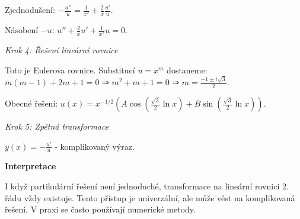 \begin{example}
Zjednodušení: $-\frac{u''}{u} = \frac{1}{x^2} + \frac{2}{x}\frac{u'}{u}$.

Násobení $-u$: $u'' + \frac{2}{x}u' + \frac{1}{x^2}u = 0$.

\noindent\textit{Krok 4: Řešení lineární rovnice}

Toto je Eulerova rovnice. Substitucí $u = x^m$ dostaneme:
$m(m-1) + 2m + 1 = 0$ ⇒ $m^2 + m + 1 = 0$ ⇒ $m = \frac{-1 \pm i\sqrt{3}}{2}$.

Obecné řešení: $u(x) = x^{-1/2}\left(A\cos\left(\frac{\sqrt{3}}{2}\ln x\right) + B\sin\left(\frac{\sqrt{3}}{2}\ln x\right)\right)$.

\noindent\textit{Krok 5: Zpětná transformace}

$y(x) = -\frac{u'}{u}$ - komplikovaný výraz.

\vspace{1.5\baselineskip}

\noindent\textbf{Interpretace}

I když partikulární řešení není jednoduché, transformace na lineární rovnici 
2. řádu vždy existuje. Tento přístup je univerzální, ale může vést na 
komplikovaná řešení. V praxi se často používají numerické metody.

\end{example}

\vspace{2\baselineskip}

